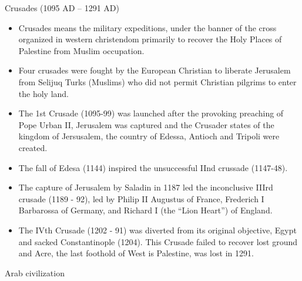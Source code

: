 \documentclass[
  openany]{book}
\providecommand{\tightlist}{%
  \setlength{\itemsep}{0pt}\setlength{\parskip}{0pt}}
\begin{document}
Crusades (1095 AD -- 1291 AD)

\begin{itemize}
\tightlist
\item
  Crusades means the military expeditions, under the banner of the cross organized in western christendom primarily to recover the Holy Places of Palestine from Muslim occupation.
\item
  Four crusades were fought by the European Christian to liberate Jerusalem from Selijuq Turks (Muslims) who did not permit Christian pilgrims to enter the holy land.
\item
  The 1st Crusade (1095-99) was launched after the provoking preaching of Pope Urban II, Jerusalem was captured and the Crusader states of the kingdom of Jersusalem, the country of Edessa, Antioch and Tripoli were created.
\item
  The fall of Edesa (1144) inspired the unsuccessful IInd crussade (1147-48).
\item
  The capture of Jerusalem by Saladin in 1187 led the inconclusive IIIrd crusade (1189 - 92), led by Philip II Augustus of France, Frederich I Barbarossa of Germany, and Richard I (the ``Lion Heart'') of England.
\item
  The IVth Crusade (1202 - 91) was diverted from its original objective, Egypt and sacked Constantinople (1204). This Crusade failed to recover lost ground and Acre, the last foothold of West is Palestine, was lost in 1291.
\end{itemize}

Arab civilization
\end{document}
